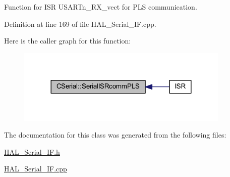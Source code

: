 Function for I\+SR U\+S\+A\+R\+Tn\+\_\+\+R\+X\+\_\+vect for P\+LS communication. 



Definition at line 169 of file H\+A\+L\+\_\+\+Serial\+\_\+\+I\+F.\+cpp.

Here is the caller graph for this function\+:
\nopagebreak
\begin{figure}[H]
\begin{center}
\leavevmode
\includegraphics[width=288pt]{class_c_serial_a707841754d94fc1ab6679f52bf413d85_icgraph}
\end{center}
\end{figure}


The documentation for this class was generated from the following files\+:\begin{DoxyCompactItemize}
\item 
\mbox{\hyperlink{_h_a_l___serial___i_f_8h}{H\+A\+L\+\_\+\+Serial\+\_\+\+I\+F.\+h}}\item 
\mbox{\hyperlink{_h_a_l___serial___i_f_8cpp}{H\+A\+L\+\_\+\+Serial\+\_\+\+I\+F.\+cpp}}\end{DoxyCompactItemize}

